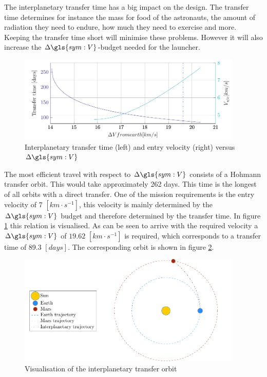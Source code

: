 The interplanetary transfer time has a big impact on the design. The transfer time determines for instance the mass for food of the astronauts, the amount of radiation they need to endure, how much they need to exercise and more. Keeping the transfer time short will minimise these problems. However it will also increase the $\Delta\gls{sym:V}$-budget needed for the launcher. 

\begin{figure}[ht]
	\centering
	\includegraphics[width=0.95\textwidth]{Figure/Inter_transfer/transfer_time.pdf}
	\caption[Interplanetary transfer time and entry velocity versus $\Delta\gls{sym:V}$]{Interplanetary transfer time (left) and entry velocity (right) versus $\Delta\gls{sym:V}$}
	\label{fig:inter_time}
\end{figure}

The most efficient travel with respect to $\Delta\gls{sym:V}$ consists of a Hohmann transfer orbit. This would take approximately 262 days. This time is the longest of all orbits with a direct transfer. One of the mission requirements is the entry velocity of 7 $\left[km \cdot s^{-1}\right]$, this velocity is mainly determined by the $\Delta \gls{sym:V}$ budget and therefore determined by the transfer time. In figure \ref{fig:inter_time} this relation is visualised. As can be seen to arrive with the required velocity a $\Delta \gls{sym:V}$ of $19.62$ $\left[km \cdot s^{-1}\right]$ is required, which corresponds to a transfer time of 89.3 $\left[days\right]$. The corresponding orbit is shown in figure \ref{fig:inter_orbit}.

\begin{figure}[ht]
	\centering
	\includegraphics[width=0.95\textwidth]{Figure/Inter_transfer/orbits.pdf}
	\caption{Visualisation of the interplanetary transfer orbit}
	\label{fig:inter_orbit}
\end{figure}
